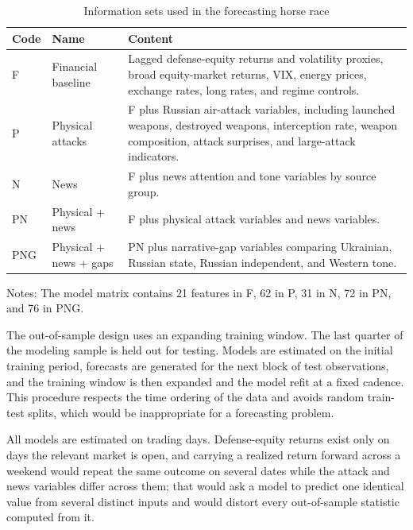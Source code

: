 \documentclass[12pt,a4paper]{article}
\begin{document}
\begin{table}[H]
\centering
\caption{Information sets used in the forecasting horse race}
\label{tab:info_sets}
\begin{threeparttable}
\begin{tabular}{p{2cm} p{4cm} p{7cm}}
\toprule
Code & Name & Content \\
\midrule
F & Financial baseline & Lagged defense-equity returns and volatility proxies, broad equity-market returns, VIX, energy prices, exchange rates, long rates, and regime controls. \\
P & Physical attacks & F plus Russian air-attack variables, including launched weapons, destroyed weapons, interception rate, weapon composition, attack surprises, and large-attack indicators. \\
N & News & F plus news attention and tone variables by source group. \\
PN & Physical + news & F plus physical attack variables and news variables. \\
PNG & Physical + news + gaps & PN plus narrative-gap variables comparing Ukrainian, Russian state, Russian independent, and Western tone. \\
\bottomrule
\end{tabular}
\begin{tablenotes}
\small
\item Notes: The model matrix contains 21 features in F, 62 in P, 31 in N, 72 in PN, and 76 in PNG.
\end{tablenotes}
\end{threeparttable}
\end{table}

The out-of-sample design uses an expanding training window. The last quarter of the modeling sample is held out for testing. Models are estimated on the initial training period, forecasts are generated for the next block of test observations, and the training window is then expanded and the model refit at a fixed cadence. This procedure respects the time ordering of the data and avoids random train-test splits, which would be inappropriate for a forecasting problem.

All models are estimated on trading days. Defense-equity returns exist only on days the relevant market is open, and carrying a realized return forward across a weekend would repeat the same outcome on several dates while the attack and news variables differ across them; that would ask a model to predict one identical value from several distinct inputs and would distort every out-of-sample statistic computed from it.
\end{document}
